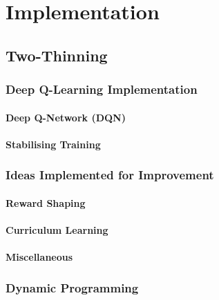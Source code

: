 \chapter{Implementation}\label{implementation}

\ifpdf
    \graphicspath{{Chapter3/Figs/Raster/}{Chapter3/Figs/PDF/}{Chapter3/Figs/}}
\else
    \graphicspath{{Chapter3/Figs/Vector/}{Chapter3/Figs/}}
\fi


\section{Two-Thinning}


\subsection{Deep Q-Learning Implementation}


\subsubsection{Deep Q-Network (DQN)}


\subsubsection{Stabilising Training}


\subsection{Ideas Implemented for Improvement}


\subsubsection{Reward Shaping}


\subsubsection{Curriculum Learning}


\subsubsection{Miscellaneous}


\subsection{Dynamic Programming}


